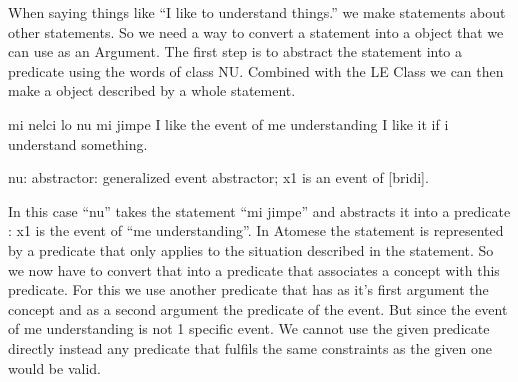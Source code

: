 When saying things like “I like to understand things.” we make statements about other statements. So we need a way to convert a statement into a object that we can use as an Argument. The first step is to abstract the statement into a predicate using the words of class NU. Combined with the LE Class we can then make a object described by a whole statement.

\begin{center}
    mi nelci lo nu mi jimpe
    I like the event of me understanding
    I like it if i understand something.

nu: abstractor: generalized event abstractor; x1 is an event of [bridi].
\end{center}

In this case “nu” takes the statement “mi jimpe” and abstracts it into a predicate : x1 is the event of “me understanding”.
In Atomese the statement is represented by a predicate that only applies to the situation described in the statement. So we now have to convert that into a predicate that associates a concept with this predicate. For this we use another predicate that has as it’s first argument the concept and as a second argument the predicate of the event.
But since the event of me understanding is not 1 specific event. We cannot use the given predicate directly instead any predicate that fulfils the same constraints as the given one would be valid.

